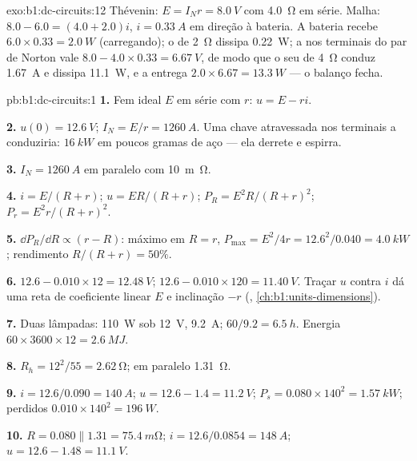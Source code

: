 \begin{solution}{exo:b1:dc-circuits:12}
Thévenin: $E = I_N r = \qty{8.0}{V}$ com \qty{4.0}{\ohm} em série.
Malha: $8.0 - 6.0 = (4.0 + 2.0)i$, $i = \qty{0.33}{A}$ em direção à bateria.
A bateria recebe $6.0 \times 0.33 = \qty{2.0}{W}$ (carregando); o  de
\qty{2}{\ohm} dissipa \qty{0.22}{W}; a  nos terminais do
par de Norton vale $8.0 - 4.0 \times 0.33 = \qty{6.67}{V}$, de modo que o seu
 de \qty{4}{\ohm} conduz \qty{1.67}{A} e dissipa \qty{11.1}{W}, e a
 entrega $2.0 \times 6.67 = \qty{13.3}{W}$ --- o balanço
fecha.
\end{solution}

\begin{solution}{pb:b1:dc-circuits:1}
\textbf{1.} Fem ideal $E$ em série com $r$: $u = E - ri$.

\textbf{2.} $u(0) = \qty{12.6}{V}$; $I_N = E/r = \qty{1260}{A}$. Uma chave
atravessada nos terminais a conduziria: $\qty{16}{kW}$ em poucos gramas de
aço --- ela derrete e espirra.

\textbf{3.}  $I_N = \qty{1260}{A}$ em paralelo com
\qty{10}{m\ohm}.

\textbf{4.} $i = E/(R + r)$; $u = ER/(R + r)$; $P_R = E^2R/(R + r)^2$;
$P_r = E^2r/(R + r)^2$.

\textbf{5.} $\dd P_R/\dd R \propto (r - R)$: máximo em $R = r$,
$P_{\max} = E^2/4r = 12.6^2/0.040 = \qty{4.0}{kW}$; rendimento
$R/(R + r) = 50\%$.

\textbf{6.} $12.6 - 0.010 \times 12 = \qty{12.48}{V}$; $12.6 - 0.010 \times
120 = \qty{11.40}{V}$. Traçar $u$ contra $i$ dá uma reta de
coeficiente linear $E$ e inclinação $-r$ (, \cref{ch:b1:units-dimensions}).

\textbf{7.} Duas lâmpadas: \qty{110}{W} sob \qty{12}{V}, \qty{9.2}{A};
$60/9.2 = \qty{6.5}{h}$. Energia $60 \times 3600 \times 12 = \qty{2.6}{MJ}$.

\textbf{8.} $R_h = 12^2/55 = \qty{2.62}{\ohm}$; em paralelo \qty{1.31}{\ohm}.

\textbf{9.} $i = 12.6/0.090 = \qty{140}{A}$; $u = 12.6 - 1.4 = \qty{11.2}{V}$;
$P_s = 0.080 \times 140^2 = \qty{1.57}{kW}$; perdidos $0.010 \times 140^2 =
\qty{196}{W}$.

\textbf{10.} $R = 0.080 \parallel 1.31 = \qty{75.4}{m\ohm}$; $i = 12.6/0.0854
= \qty{148}{A}$; $u = 12.6 - 1.48 = \qty{11.1}{V}$.


\end{solution}
